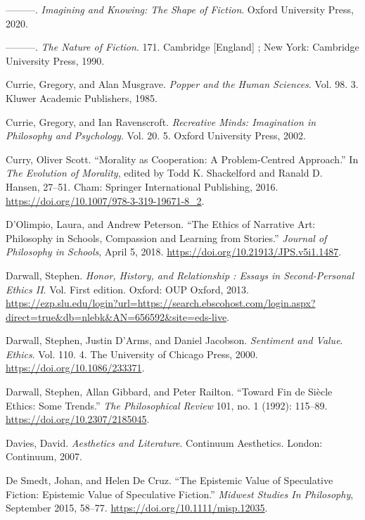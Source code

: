 \documentclass[
  12pt,
]{book}
\newlength{\cslhangindent}
\newenvironment{CSLReferences}[2] %
 {\begin{list}{}{%
  \setlength{\itemindent}{0pt}
  \setlength{\leftmargin}{0pt}
  \setlength{\parsep}{0pt}
  \ifodd #1
   \setlength{\leftmargin}{\cslhangindent}
   \setlength{\itemindent}{-1\cslhangindent}
  \fi
  \setlength{\itemsep}{#2\baselineskip}}}
 {\end{list}}
\theoremstyle{definition}
\theoremstyle{definition}
\theoremstyle{definition}
\theoremstyle{definition}
\theoremstyle{remark}
\begin{document}
\begin{CSLReferences}{1}{0}
---------. \emph{Imagining and Knowing: The Shape of Fiction}. Oxford University Press, 2020.

---------. \emph{The Nature of Fiction}. 171. Cambridge {[}England{]} ; New York: Cambridge University Press, 1990.

Currie, Gregory, and Alan Musgrave. \emph{Popper and the Human Sciences}. Vol. 98. 3. Kluwer Academic Publishers, 1985.

Currie, Gregory, and Ian Ravenscroft. \emph{Recreative Minds: Imagination in Philosophy and Psychology}. Vol. 20. 5. Oxford University Press, 2002.

Curry, Oliver Scott. {``Morality as {Cooperation}: {A Problem-Centred Approach}.''} In \emph{The {Evolution} of {Morality}}, edited by Todd K. Shackelford and Ranald D. Hansen, 27--51. Cham: Springer International Publishing, 2016. \url{https://doi.org/10.1007/978-3-319-19671-8_2}.

D'Olimpio, Laura, and Andrew Peterson. {``The Ethics of Narrative Art: Philosophy in Schools, Compassion and Learning from Stories.''} \emph{Journal of Philosophy in Schools}, April 5, 2018. \url{https://doi.org/10.21913/JPS.v5i1.1487}.

Darwall, Stephen. \emph{Honor, {History}, and {Relationship} : {Essays} in {Second-Personal Ethics II}}. Vol. First edition. Oxford: OUP Oxford, 2013. \url{https://ezp.slu.edu/login?url=https://search.ebscohost.com/login.aspx?direct=true&db=nlebk&AN=656592&site=eds-live}.

Darwall, Stephen, Justin D'Arms, and Daniel Jacobson. \emph{Sentiment and {Value}}. \emph{Ethics}. Vol. 110. 4. The University of Chicago Press, 2000. \url{https://doi.org/10.1086/233371}.

Darwall, Stephen, Allan Gibbard, and Peter Railton. {``Toward Fin de Siècle Ethics: Some Trends.''} \emph{The Philosophical Review} 101, no. 1 (1992): 115--89. \url{https://doi.org/10.2307/2185045}.

Davies, David. \emph{Aesthetics and Literature}. Continuum Aesthetics. London: Continuum, 2007.

De Smedt, Johan, and Helen De Cruz. {``The Epistemic Value of Speculative Fiction: Epistemic Value of Speculative Fiction.''} \emph{Midwest Studies In Philosophy}, September 2015, 58--77. \url{https://doi.org/10.1111/misp.12035}.


\end{CSLReferences}
\end{document}
